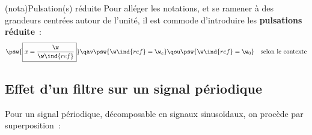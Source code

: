 \documentclass[../../main/main.tex]{subfiles}
\begin{document}
\begin{tcb*}(nota){Pulsation(s) réduite}
	Pour alléger les notations, et se ramener à des grandeurs centrées autour de
	l'unité, il est commode d'introduire les \textbf{pulsations réduite}~:
	\[
		\psw{%
			\boxed{x = \frac{\w}{\w\ind{ref}}}
		}%
		\qav
		\psw{\w\ind{ref} = \w_c}
		\qou
		\psw{\w\ind{ref} = \w_0}
		\quad \text{selon le contexte}
	\]
	\vspace{-15pt}
\end{tcb*}

\subsection{Effet d'un filtre sur un signal périodique}


Pour un signal périodique, décomposable en signaux sinusoïdaux, on procède par
superposition~:
\end{document}
